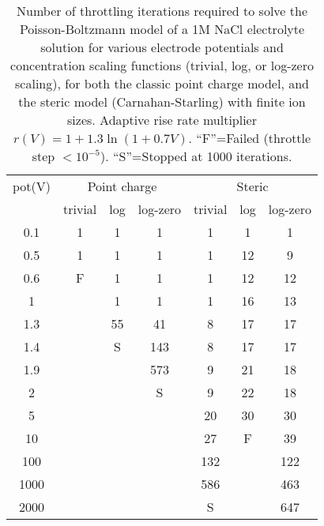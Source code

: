 \begin{table}
  \centering
  \begin{tabular}{c|ccc|ccc}
pot(V)  & \multicolumn{3}{c|}{Point charge} & \multicolumn{3}{c}{Steric}    \\
        & trivial & log & log-zero & trivial & log & log-zero \\ \hline
0.1	&1	&1	&1	&1	&1	&1\\
0.5	&1	&1	&1	&1	&12	&9\\
0.6	&F	&1	&1	&1	&12	&12\\
1	&	&1	&1	&1	&16	&13\\
1.3	&	&55	&41	&8	&17	&17\\
1.4	&	&S	&143	&8	&17	&17\\
1.9	&	&	&573	&9	&21	&18\\
2	&	&	&S	&9	&22	&18\\
5	&	&	&	&20	&30	&30\\
10	&	&	&	&27	&F	&39\\
100	&	&	&	&132	&	&122\\
1000	&	&	&	&586	&	&463    \\
2000	&	&	&	&S	&	&647    
  \end{tabular}
\caption{\label{tab:convergence}Number of throttling iterations
  required to  solve the  Poisson-Boltzmann model of a 1M NaCl electrolyte solution
  for various electrode potentials and concentration scaling
  functions (trivial, log, or log-zero scaling), for both the classic point charge model, and the steric
  model (Carnahan-Starling) with finite ion sizes. Adaptive rise rate
  multiplier $r(V)=1+1.3\ln(1+0.7V)$.
  ``F''=Failed
  (throttle step $<10^{-5}$). ``S''=Stopped at 1000 iterations.}
\end{table}


